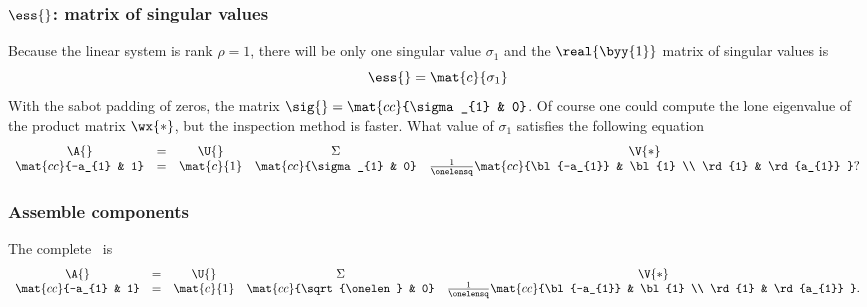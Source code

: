 \subsubsection{$\ess{}$: matrix of singular values	}  %
Because the linear system is rank $\rho=1$, there will be only one singular value $\sigma_{1}$ and the $\real{\byy{1}}$ matrix of singular values is
  \begin{equation*}   %
    \ess{} = \mat{c}{\sigma_{1}}
  \end{equation*}
With the sabot padding of zeros, 
the matrix $\sig{} = \mat{cc}{\sigma_{1} & 0}$. Of course one could compute the lone eigenvalue of the product matrix $\wx{*}$, but the inspection method is faster. What value of $\sigma_{1}$ satisfies the following equation
  \begin{equation*}   %
    \begin{array}{ccccc}
      \A{} &=& \U{} & \Sigma & \V{*} \\
      \mat{cc}{-a_{1} & 1} &=& 
      \mat{c}{1} & 
      \mat{cc}{\sigma_{1} & 0} & 
      \frac{1}{\onelensq}
      \mat{cc}{\bl{-a_{1}} & \bl{1} \\ \rd{1} & \rd{a_{1}} } ?
    \end{array}
  \end{equation*}

\subsubsection{Assemble components}  %
The complete \asvd \ is
  \begin{equation*}   %
    \begin{array}{ccccc}
      \A{} &=& \U{} & \Sigma & \V{*} \\
      \mat{cc}{-a_{1} & 1} &=& 
      \mat{c}{1} & 
      \mat{cc}{\sqrt{\onelen} & 0} & 
      \frac{1}{\onelensq}
      \mat{cc}{\bl{-a_{1}} & \bl{1} \\ \rd{1} & \rd{a_{1}} } .
    \end{array}
  \end{equation*}


